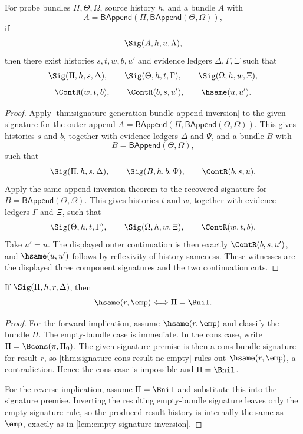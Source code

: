 \begin{theorem}
\label{thm:three-bundle-signature-cut-inversion}
For probe bundles $\Pi,\Theta,\Omega$, source history $h$, and a bundle $A$ with
$$
A=\mathsf{BAppend}(\Pi,\mathsf{BAppend}(\Theta,\Omega)),
$$
if
$$
\Sig(A,h,u,\Lambda),
$$
then there exist histories $s,t,w,b,u'$ and evidence ledgers $\Delta,\Gamma,\Xi$ such that
$$
\Sig(\Pi,h,s,\Delta),
\qquad
\Sig(\Theta,h,t,\Gamma),
\qquad
\Sig(\Omega,h,w,\Xi),
$$
$$
\ContR(w,t,b),
\qquad
\ContR(b,s,u'),
\qquad
\hsame(u,u').
$$
\end{theorem}
\begin{proof}
Apply \autoref{thm:signature-generation-bundle-append-inversion} to the given signature for the outer append
$A=\mathsf{BAppend}(\Pi,\mathsf{BAppend}(\Theta,\Omega))$. This gives histories $s$ and $b$, together with evidence ledgers $\Delta$ and $\Psi$, and a bundle $B$ with
$$
B=\mathsf{BAppend}(\Theta,\Omega),
$$
such that
$$
\Sig(\Pi,h,s,\Delta),
\qquad
\Sig(B,h,b,\Psi),
\qquad
\ContR(b,s,u).
$$
Apply the same append-inversion theorem to the recovered signature for
$B=\mathsf{BAppend}(\Theta,\Omega)$. This gives histories $t$ and $w$, together with evidence ledgers $\Gamma$ and $\Xi$, such that
$$
\Sig(\Theta,h,t,\Gamma),
\qquad
\Sig(\Omega,h,w,\Xi),
\qquad
\ContR(w,t,b).
$$
Take $u'=u$. The displayed outer continuation is then exactly $\ContR(b,s,u')$, and $\hsame(u,u')$ follows by reflexivity of history-sameness. These witnesses are the displayed three component signatures and the two continuation cuts.
\end{proof}

\begin{theorem}
\label{thm:signature-empty-result-iff-empty-bundle}
If $\Sig(\Pi,h,r,\Delta)$, then
$$
\hsame(r,\emp)\Longleftrightarrow \Pi=\Bnil.
$$
\end{theorem}
\begin{proof}
For the forward implication, assume $\hsame(r,\emp)$ and classify the bundle $\Pi$. The empty-bundle case is immediate. In the cons case, write $\Pi=\Bcons(\pi,\Pi_0)$. The given signature premise is then a cons-bundle signature for result $r$, so \autoref{thm:signature-cons-result-ne-empty} rules out $\hsame(r,\emp)$, a contradiction. Hence the cons case is impossible and $\Pi=\Bnil$.

For the reverse implication, assume $\Pi=\Bnil$ and substitute this into the signature premise. Inverting the resulting empty-bundle signature leaves only the empty-signature rule, so the produced result history is internally the same as $\emp$, exactly as in \autoref{lem:empty-signature-inversion}.
\end{proof}

